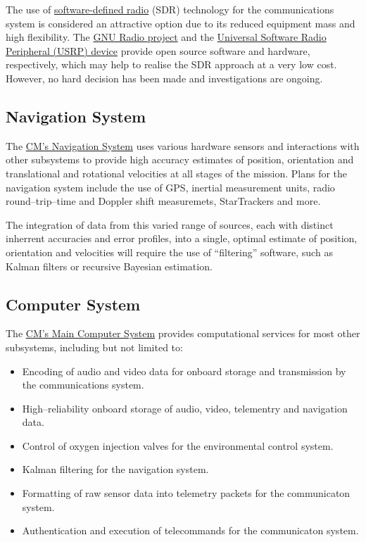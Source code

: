 \documentclass{report}
\begin{document}
The use of \href{http://en.wikipedia.org/wiki/Software_defined_radio}{software-defined radio} (SDR) technology for the communications system is considered an attractive option due to its reduced equipment mass and high flexibility.  The \href{http://gnuradio.org/redmine/wiki/gnuradio}{GNU Radio project} and the \href{http://www.ettus.com/products}{Universal Software Radio Peripheral (USRP) device} provide open source software and hardware, respectively, which may help to realise the SDR approach at a very low cost.  However, no hard decision has been made and investigations are ongoing.

\subsection{Navigation System}

The \href{http://cstart.org/wiki/CLLARE_CM_Navigation_System}{CM's Navigation System} uses various hardware sensors and interactions with other subsystems to provide high accuracy estimates of position, orientation and translational and rotational velocities at all stages of the mission.  Plans for the navigation system include the use of GPS, inertial measurement units, radio round--trip--time and Doppler shift measuremets, StarTrackers and more.

The integration of data from this varied range of sources, each with distinct inherrent accuracies and error profiles, into a single, optimal estimate of position, orientation and velocities will require the use of ``filtering'' software, such as Kalman filters or recursive Bayesian estimation.

\subsection{Computer System}

The \href{http://cstart.org/wiki/CLLARE_Main_Computer_System}{CM's Main Computer System} provides computational services for most other subsystems, including but not limited to:
\begin{itemize}
\item Encoding of audio and video data for onboard storage and transmission by the communications system.
\item High--reliability onboard storage of audio, video, telementry and navigation data.
\item Control of oxygen injection valves for the environmental control system.
\item Kalman filtering for the navigation system.
\item Formatting of raw sensor data into telemetry packets for the communicaton system.
\item Authentication and execution of telecommands for the communicaton system.
\end{itemize}
\end{document}
